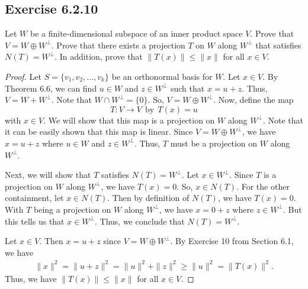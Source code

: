 \subsection*{Exercise 6.2.10} Let \( W  \) be a finite-dimensional subspace of an inner product space \( V  \). Prove that \( V = W \oplus W^{\perp} \). Prove that there exists a projection \( T  \) on \( W  \) along \( W^{\perp} \) that satisfies \( N(T) = W^{\perp} \). In addition, prove that \( \|T(x)\| \leq \|x\| \) for all \( x \in V  \).
\begin{proof}
  Let \( S = \{ {v}_{1}, {v}_{2}, \dots, {v}_{k} \}   \) be an orthonormal basis for \( W  \). Let \( x \in V  \). By Theorem 6.6, we can find \( u \in W  \) and \( z \in W^{\perp} \) such that \( x = u + z  \). Thus, \( V = W + W^{\perp} \). Note that \( W \cap W^{\perp} = \{ 0  \}  \). So, \( V = W \oplus W^{\perp}  \). Now, define the map
  \[  T: V \to V  \ \ \text{by} \ \ T(x) = u    \]
  with \( x \in V   \). We will show that this map is a projection on \( W  \) along \( W^{\perp} \). Note that it can be easily shown that this map is linear. Since \( V = W \oplus W^{\perp}  \), we have \( x = u + z  \) where \( u \in W  \) and \( z \in W^{\perp} \). Thus, \( T  \) must be a projection on \( W  \) along \( W^{\perp} \). 

  Next, we will show that \( T  \) satisfies \( N(T) = W^{\perp}  \). Let \( x \in W^{\perp} \). Since \( T  \) is a projection on \( W  \) along \( W^{\perp} \), we have \( T(x) = 0  \). So, \( x \in N(T) \). For the other containment, let \( x \in N(T) \). Then by definition of \( N(T) \), we have \( T(x) = 0  \). With \( T  \) being a projection on \( W  \) along \( W^{\perp} \), we have \( x = 0 + z  \) where \( z \in W^{\perp} \). But this tells us that \( x \in W^{\perp} \). Thus, we conclude that \( N(T) = W^{\perp}  \).  

  Let \( x \in V  \). Then \( x = u + z  \) since \( V = W \oplus W^{\perp} \). By Exercise 10 from Section 6.1, we have 
  \begin{align*}
      \|x\|^{2} = \|u + z\|^{2} = \|u\|^{2} + \|z\|^{2} 
                                \geq \|u\|^{2} 
                                = \|T(x)\|^{2}.
  \end{align*}
  Thus, we have \( \|T(x)\| \leq \|x\| \) for all \( x \in V  \).
\end{proof}

